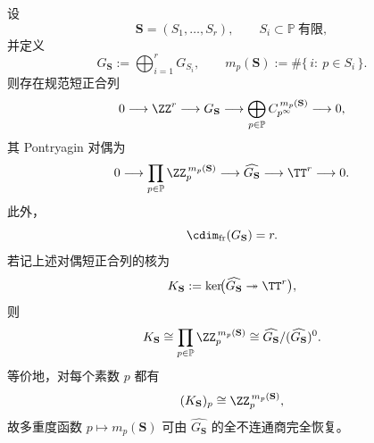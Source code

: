 \begin{theorem}[有限局部化直和的二轴账本分解与圆维公式]\label{thm:xi-localized-directsum-twoaxis-ledger}
设
\[
\mathbf S=(S_1,\dots,S_r),
\qquad
S_i\subset\mathbb P\ \text{有限},
\]
并定义
\[
G_{\mathbf S}:=\bigoplus_{i=1}^{r}G_{S_i},
\qquad
m_p(\mathbf S):=\#\{\,i:\ p\in S_i\,\}.
\]
则存在规范短正合列
\[
0\longrightarrow \ZZ^r\longrightarrow G_{\mathbf S}
\longrightarrow \bigoplus_{p\in\mathbb P} C_{p^\infty}^{\,m_p(\mathbf S)}
\longrightarrow 0,
\]
其 Pontryagin 对偶为
\[
0\longrightarrow \prod_{p\in\mathbb P}\ZZ_p^{\,m_p(\mathbf S)}
\longrightarrow \widehat{G_{\mathbf S}}
\longrightarrow \TT^r
\longrightarrow 0.
\]
此外，
\[
\cdim_{\mathrm{fr}}(G_{\mathbf S})=r.
\]
若记上述对偶短正合列的核为
\[
K_{\mathbf S}:=\ker\!\bigl(\widehat{G_{\mathbf S}}\twoheadrightarrow \TT^r\bigr),
\]
则
\[
K_{\mathbf S}\cong \prod_{p\in\mathbb P}\ZZ_p^{\,m_p(\mathbf S)}
\cong
\widehat{G_{\mathbf S}}/(\widehat{G_{\mathbf S}})^0.
\]
等价地，对每个素数 \(p\) 都有
\[
(K_{\mathbf S})_p\cong \ZZ_p^{\,m_p(\mathbf S)},
\]
故多重度函数 \(p\mapsto m_p(\mathbf S)\) 可由 \(\widehat{G_{\mathbf S}}\) 的全不连通商完全恢复。
\end{theorem}
